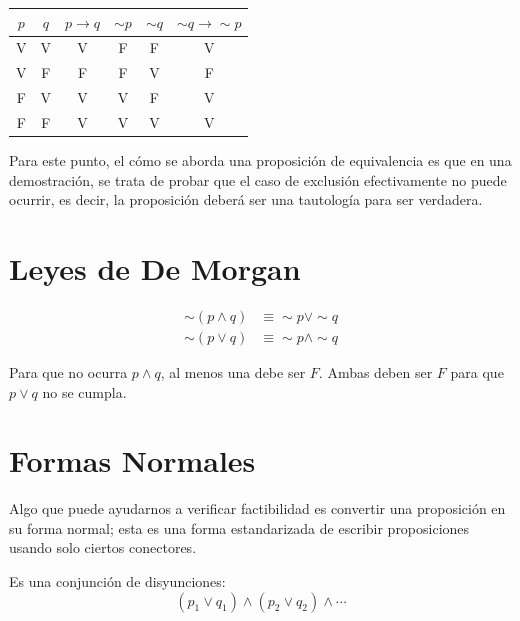  \begin{minipage}[t]{0.48\textwidth}
  \begin{tabular}{c|c|c|c|c|c}
  $p$ & $q$ & $p \to q$ & $\sim p$ & $\sim q$ & $\sim q \to \sim p$ \\
  \hline
  V & V & V & F & F & V \\
  V & F & F & F & V & F \\
  F & V & V & V & F & V \\
  F & F & V & V & V & V \\
  \end{tabular}
  \end{minipage}

  Para este punto, el cómo se aborda una proposición de equivalencia es
  que en una demostración, se trata de probar que el caso de exclusión
  efectivamente no puede ocurrir, es decir, la proposición deberá ser una
  tautología para ser verdadera.

  \section{Leyes de De Morgan}

  \begin{theorem}[title={Leyes de De Morgan}]
  \begin{align}
  \sim(p \land q) &\equiv \sim p \lor \sim q \\
  \sim(p \lor q)  &\equiv \sim p \land \sim q
  \end{align}
  \end{theorem}

  Para que no ocurra $p \land q$, al menos una debe ser $F$. Ambas deben
  ser $F$ para que $p \lor q$ no se cumpla.

  \section{Formas Normales}

  Algo que puede ayudarnos a verificar factibilidad es convertir una
  proposición en su forma normal; esta es una forma estandarizada de
  escribir proposiciones usando solo ciertos conectores.

  \begin{definition}[title={Forma Normal Disyuntiva (FND)}]
  Es una conjunción de disyunciones:
  \begin{equation}
  (p_1 \lor q_1) \land (p_2 \lor q_2) \land \cdots
  \end{equation}
  \end{definition}

